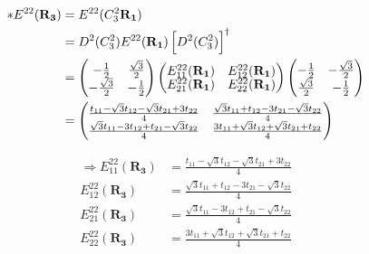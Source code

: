 \documentclass{article}
\begin{document}
\begin{align*}
	\ast E^{22}(\mathbf{R_3}) & = E^{22}(C_3^2\mathbf{ R_1})                                                                                                   \\
	                          & = D^2(C_3^2)  E^{22}(\mathbf{R_1}) \left[ D^2(C_3^2) \right]^\dagger                                                           \\
	                          &
	=
	\begin{pmatrix}
		\renewcommand{\arraystretch}{0.72}
		-\frac{1}{2}        & \frac{\sqrt{3}}{2} \\
		-\frac{\sqrt{3}}{2} & -\frac{1}{2}
	\end{pmatrix}
	\begin{pmatrix}
		E_{11}^{22}(\mathbf{R_1}) & E_{12}^{22}(\mathbf{R_1}) \\
		E_{21}^{22}(\mathbf{R_1}) & E_{22}^{22}(\mathbf{R_1})
	\end{pmatrix}
	\begin{pmatrix}
		-\frac{1}{2}       & -\frac{\sqrt{3}}{2} \\
		\frac{\sqrt{3}}{2} & -\frac{1}{2}
	\end{pmatrix}                                                                                                   \\
	                          & = \begin{pmatrix}
		                              \frac{t_{11} - \sqrt{3}t_{12} - \sqrt{3}t_{21} + 3t_{22}}{4} & \frac{\sqrt{3}t_{11} + t_{12} - 3 t_{21} - \sqrt{3}t_{22}}{4} \\
		                              \frac{\sqrt{3}t_{11} - 3t_{12} + t_{21} - \sqrt{3}t_{22}}{4} & \frac{3t_{11} + \sqrt{3}t_{12} + \sqrt{3}t_{21} + t_{22}}{4}
	                              \end{pmatrix}
\end{align*}

\begin{align*}
	\Rightarrow E_{11}^{22}(\mathbf{R_3}) & = \frac{t_{11} - \sqrt{3}t_{12} - \sqrt{3}t_{21} + 3t_{22}}{4} \\
	E_{12}^{22}(\mathbf{R_3})             & = \frac{\sqrt{3}t_{11} + t_{12} - 3 t_{21} -\sqrt{3}t_{22}}{4} \\
	E_{21}^{22}(\mathbf{R_3})             & = \frac{\sqrt{3}t_{11} - 3t_{12} + t_{21} - \sqrt{3}t_{22}}{4} \\
	E_{22}^{22}(\mathbf{R_3})             & = \frac{3t_{11} + \sqrt{3}t_{12} + \sqrt{3}t_{21} + t_{22}}{4} \\
\end{align*}
\end{document}
